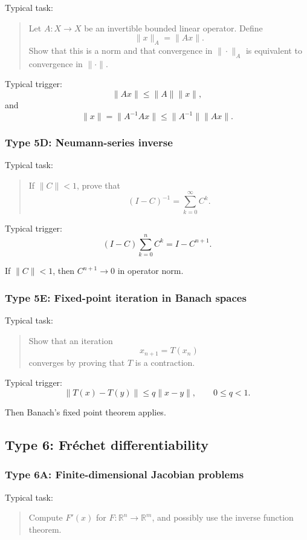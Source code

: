 Typical task:
\begin{quote}
    Let $A:X\to X$ be an invertible bounded linear operator. Define
    \[
        \|x\|_A=\|Ax\|.
    \]
    Show that this is a norm and that convergence in $\|\cdot\|_A$ is equivalent to convergence in $\|\cdot\|$.
\end{quote}

Typical trigger:
\[
    \|Ax\|\leq \|A\|\|x\|,
\]
and
\[
    \|x\|=\|A^{-1}Ax\|
    \leq
    \|A^{-1}\|\|Ax\|.
\]

\subsubsection*{Type 5D: Neumann-series inverse}

Typical task:
\begin{quote}
    If $\|C\|<1$, prove that
    \[
        (I-C)^{-1}=\sum_{k=0}^\infty C^k.
    \]
\end{quote}

Typical trigger:
\[
    (I-C)\sum_{k=0}^n C^k=I-C^{n+1}.
\]

If $\|C\|<1$, then $C^{n+1}\to 0$ in operator norm.

\subsubsection*{Type 5E: Fixed-point iteration in Banach spaces}

Typical task:
\begin{quote}
    Show that an iteration
    \[
        x_{n+1}=T(x_n)
    \]
    converges by proving that $T$ is a contraction.
\end{quote}

Typical trigger:
\[
    \|T(x)-T(y)\|\leq q\|x-y\|,
    \qquad 0\leq q<1.
\]

Then Banach's fixed point theorem applies.

\subsection{Type 6: Fréchet differentiability}

\subsubsection*{Type 6A: Finite-dimensional Jacobian problems}

Typical task:
\begin{quote}
    Compute $F'(x)$ for $F:\mathbb R^n\to\mathbb R^m$, and possibly use the inverse function theorem.
\end{quote}

